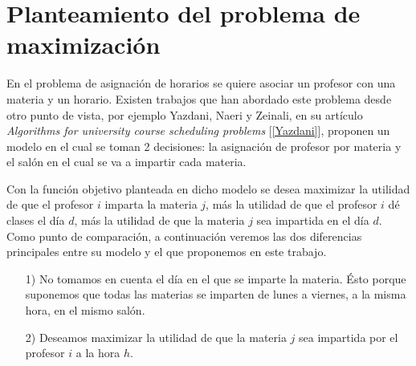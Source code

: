 
  
%
%

  
  
  \section{Planteamiento del problema de maximización}

En el problema de asignación de horarios se quiere asociar un profesor con una materia y un horario. Existen trabajos que han abordado este problema desde otro punto de vista, por ejemplo Yazdani, Naeri y Zeinali, en su artículo \textit{Algorithms for university course scheduling problems} [\ref{Yazdani}], proponen un modelo en el cual se toman 2 decisiones: la asignación de profesor por materia y el salón en el cual se va a impartir cada materia.

Con la función objetivo planteada en dicho modelo se desea maximizar la utilidad de que el profesor $i$ imparta la materia $j$, más la utilidad de que el profesor $i$ dé clases el día $d$, más la utilidad de que la materia $j$ sea impartida en el día $d$. Como punto de comparación, a continuación veremos las dos diferencias principales entre su modelo y el que proponemos en este trabajo.

\begin{enumerate}
\item[1)] No tomamos en cuenta el día en el que se imparte la materia. Ésto porque suponemos que todas las materias se imparten de lunes a viernes, a la misma hora, en el mismo salón.

\item[2)] Deseamos maximizar la utilidad de que la materia $j$ sea impartida por  el profesor $i$ a la hora $h$.
\end{enumerate}

